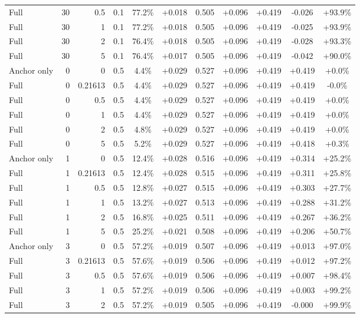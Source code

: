 \begin{table}[htbp]
\begin{tabular}{lrrrccccccc}
Full & 30 & 0.5 & 0.1 & 77.2\% & +0.018 & 0.505 & +0.096 & +0.419 & -0.026 & +93.9\% \\
Full & 30 & 1 & 0.1 & 77.2\% & +0.018 & 0.505 & +0.096 & +0.419 & -0.025 & +93.9\% \\
Full & 30 & 2 & 0.1 & 76.4\% & +0.018 & 0.505 & +0.096 & +0.419 & -0.028 & +93.3\% \\
Full & 30 & 5 & 0.1 & 76.4\% & +0.017 & 0.505 & +0.096 & +0.419 & -0.042 & +90.0\% \\
Anchor only & 0 & 0 & 0.5 & 4.4\% & +0.029 & 0.527 & +0.096 & +0.419 & +0.419 & +0.0\% \\
Full & 0 & 0.21613 & 0.5 & 4.4\% & +0.029 & 0.527 & +0.096 & +0.419 & +0.419 & -0.0\% \\
Full & 0 & 0.5 & 0.5 & 4.4\% & +0.029 & 0.527 & +0.096 & +0.419 & +0.419 & +0.0\% \\
Full & 0 & 1 & 0.5 & 4.4\% & +0.029 & 0.527 & +0.096 & +0.419 & +0.419 & +0.0\% \\
Full & 0 & 2 & 0.5 & 4.8\% & +0.029 & 0.527 & +0.096 & +0.419 & +0.419 & +0.0\% \\
Full & 0 & 5 & 0.5 & 5.2\% & +0.029 & 0.527 & +0.096 & +0.419 & +0.418 & +0.3\% \\
Anchor only & 1 & 0 & 0.5 & 12.4\% & +0.028 & 0.516 & +0.096 & +0.419 & +0.314 & +25.2\% \\
Full & 1 & 0.21613 & 0.5 & 12.4\% & +0.028 & 0.515 & +0.096 & +0.419 & +0.311 & +25.8\% \\
Full & 1 & 0.5 & 0.5 & 12.8\% & +0.027 & 0.515 & +0.096 & +0.419 & +0.303 & +27.7\% \\
Full & 1 & 1 & 0.5 & 13.2\% & +0.027 & 0.513 & +0.096 & +0.419 & +0.288 & +31.2\% \\
Full & 1 & 2 & 0.5 & 16.8\% & +0.025 & 0.511 & +0.096 & +0.419 & +0.267 & +36.2\% \\
Full & 1 & 5 & 0.5 & 25.2\% & +0.021 & 0.508 & +0.096 & +0.419 & +0.206 & +50.7\% \\
Anchor only & 3 & 0 & 0.5 & 57.2\% & +0.019 & 0.507 & +0.096 & +0.419 & +0.013 & +97.0\% \\
Full & 3 & 0.21613 & 0.5 & 57.6\% & +0.019 & 0.506 & +0.096 & +0.419 & +0.012 & +97.2\% \\
Full & 3 & 0.5 & 0.5 & 57.6\% & +0.019 & 0.506 & +0.096 & +0.419 & +0.007 & +98.4\% \\
Full & 3 & 1 & 0.5 & 57.2\% & +0.019 & 0.506 & +0.096 & +0.419 & +0.003 & +99.2\% \\
Full & 3 & 2 & 0.5 & 57.2\% & +0.019 & 0.505 & +0.096 & +0.419 & -0.000 & +99.9\% \\

\end{tabular}
\end{table}
